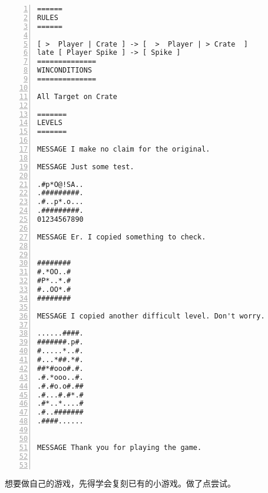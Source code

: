 \documentclass[11pt]{amsart}
\begin{document}
\begin{lstlisting}[numbers=left,numberstyle=\tiny,numbersep=10pt]
======
RULES     
======     

[ >  Player | Crate ] -> [  >  Player | > Crate  ]
late [ Player Spike ] -> [ Spike ]
==============
WINCONDITIONS
==============

All Target on Crate     

=======     
LEVELS
=======

MESSAGE I make no claim for the original. 

MESSAGE Just some test.

.#p*O@!SA..
.#########.
.#..p*.o...
.#########.
01234567890

MESSAGE Er. I copied something to check.


########
#.*OO..#
#P*..*.#
#..OO*.#
########

MESSAGE I copied another difficult level. Don't worry.

......####.
#######.p#.
#.....*..#.
#...*##.*#.
##*#ooo#.#.
.#.*ooo..#.
.#.#o.o#.##
.#...#.#*.#
.#*..*....#
.#..#######
.####......


MESSAGE Thank you for playing the game.



\end{lstlisting}

想要做自己的游戏，先得学会复刻已有的小游戏。做了点尝试。
\end{document}
